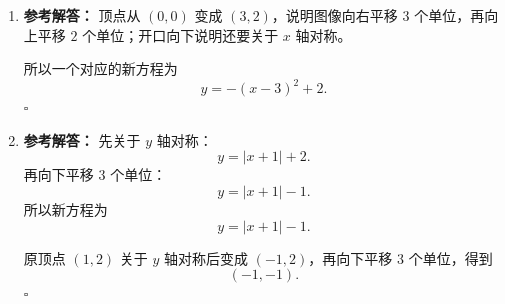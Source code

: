 \documentclass[11pt,a4paper,fontset=fandol]{ctexart}
\newenvironment{solution}{\par\noindent\textbf{参考解答：}}{\hfill$\square$\par}
\begin{document}
\begin{enumerate}
\begin{solution}
  再关于 \(x\) 轴对称，变成 \((-3,-3)\)。

  所以对应点的新坐标是
  \[
  \boxed{(-3,-3)}.
  \]
  \end{solution}

  \item \begin{solution}
  顶点从 \((0,0)\) 变成 \((3,2)\)，说明图像向右平移 $3$ 个单位，再向上平移 $2$ 个单位；开口向下说明还要关于 \(x\) 轴对称。

  所以一个对应的新方程为
  \[
  \boxed{y=-(x-3)^2+2}.
  \]
  \end{solution}

  \item \begin{solution}
  先关于 \(y\) 轴对称：
  \[
  y=|x+1|+2.
  \]
  再向下平移 $3$ 个单位：
  \[
  y=|x+1|-1.
  \]
  所以新方程为
  \[
  \boxed{y=|x+1|-1}.
  \]

  原顶点 \((1,2)\) 关于 \(y\) 轴对称后变成 \((-1,2)\)，再向下平移 $3$ 个单位，得到
  \[
  \boxed{(-1,-1)}.
  \]
  \end{solution}
\end{enumerate}
\end{document}
